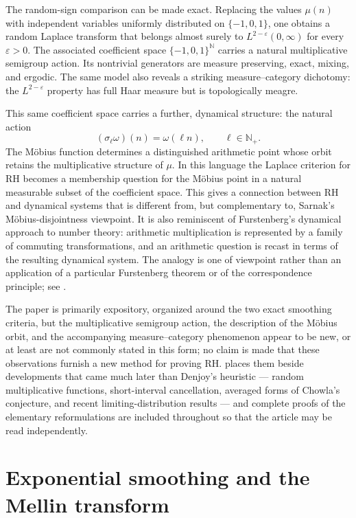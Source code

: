 \documentclass[11pt]{article}
\theoremstyle{remark}
\begin{document}
The random-sign comparison can be made exact.  Replacing the values
\(\mu(n)\) with independent variables uniformly distributed on
\(\{-1,0,1\}\), one obtains a random Laplace transform that belongs
almost surely to \(L^{2-\varepsilon}(0,\infty)\) for every
\(\varepsilon>0\).  The associated coefficient space
\(\{-1,0,1\}^{\mathbb N}\) carries a natural multiplicative semigroup
action.  Its nontrivial generators are measure preserving, exact,
mixing, and ergodic.  The same model also reveals a striking
measure--category dichotomy: the \(L^{2-\varepsilon}\) property has
full Haar measure but is topologically meagre.

This same coefficient space carries a further, dynamical structure:
the natural action
\[
(\sigma_\ell\omega)(n)=\omega(\ell n),
\qquad \ell\in\mathbb N_+.
\]
The M\"obius function determines a distinguished arithmetic point whose
orbit retains the multiplicative structure of \(\mu\).  In this
language the Laplace criterion for RH becomes a membership question for
the M\"obius point in a natural measurable subset of the coefficient
space.  This gives a connection between RH and dynamical systems that is
different from, but complementary to, Sarnak's M\"obius-disjointness
viewpoint.  It is also reminiscent of Furstenberg's dynamical approach
to number theory: arithmetic multiplication is represented by a family
of commuting transformations, and an arithmetic question is recast in
terms of the resulting dynamical system.  The analogy is one of
viewpoint rather than an application of a particular Furstenberg theorem
or of the correspondence principle; see
\cite{Furstenberg1967,Furstenberg1981}.

The paper is primarily expository, organized around the two exact
smoothing criteria, but the multiplicative semigroup action, the
description of the M\"obius orbit, and the accompanying
measure--category phenomenon appear to be new, or at least are not
commonly stated in this form; no claim is made that these observations
furnish a new method for proving RH.  
places them beside developments that came much later than Denjoy's
heuristic --- random multiplicative functions, short-interval
cancellation, averaged forms of Chowla's conjecture, and recent
limiting-distribution results --- and complete proofs of the elementary
reformulations are included throughout so that the article may be read
independently.

\section{Exponential smoothing and the Mellin transform}
\end{document}
